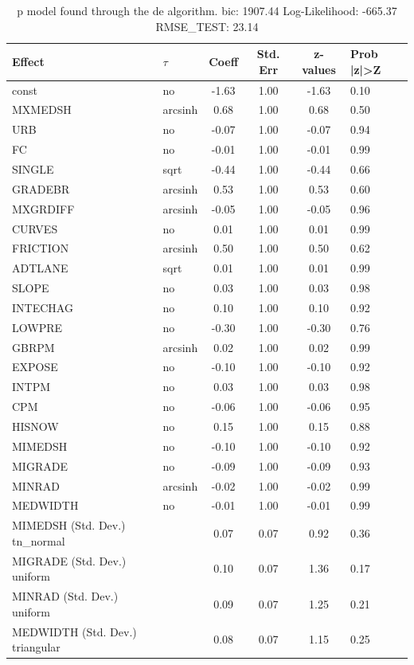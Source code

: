 \begin{table}
	\caption{p model found through the de algorithm. bic: 1907.44 Log-Likelihood: -665.37 RMSE_TEST: 23.14}
	\begin{center}
		\begin{tabular}{|l|l|c|c|c|l|}
			\hline
			Effect & $\tau$ & Coeff & Std. Err & z-values & Prob |z|>Z \\
			\hline
			const & no & -1.63 & 1.00 & -1.63 & 0.10 \\
			\hline
			MXMEDSH & arcsinh & 0.68 & 1.00 & 0.68 & 0.50 \\
			\hline
			URB & no & -0.07 & 1.00 & -0.07 & 0.94 \\
			\hline
			FC & no & -0.01 & 1.00 & -0.01 & 0.99 \\
			\hline
			SINGLE & sqrt & -0.44 & 1.00 & -0.44 & 0.66 \\
			\hline
			GRADEBR & arcsinh & 0.53 & 1.00 & 0.53 & 0.60 \\
			\hline
			MXGRDIFF & arcsinh & -0.05 & 1.00 & -0.05 & 0.96 \\
			\hline
			CURVES & no & 0.01 & 1.00 & 0.01 & 0.99 \\
			\hline
			FRICTION & arcsinh & 0.50 & 1.00 & 0.50 & 0.62 \\
			\hline
			ADTLANE & sqrt & 0.01 & 1.00 & 0.01 & 0.99 \\
			\hline
			SLOPE & no & 0.03 & 1.00 & 0.03 & 0.98 \\
			\hline
			INTECHAG & no & 0.10 & 1.00 & 0.10 & 0.92 \\
			\hline
			LOWPRE & no & -0.30 & 1.00 & -0.30 & 0.76 \\
			\hline
			GBRPM & arcsinh & 0.02 & 1.00 & 0.02 & 0.99 \\
			\hline
			EXPOSE & no & -0.10 & 1.00 & -0.10 & 0.92 \\
			\hline
			INTPM & no & 0.03 & 1.00 & 0.03 & 0.98 \\
			\hline
			CPM & no & -0.06 & 1.00 & -0.06 & 0.95 \\
			\hline
			HISNOW & no & 0.15 & 1.00 & 0.15 & 0.88 \\
			\hline
			MIMEDSH & no & -0.10 & 1.00 & -0.10 & 0.92 \\
			\hline
			MIGRADE & no & -0.09 & 1.00 & -0.09 & 0.93 \\
			\hline
			MINRAD & arcsinh & -0.02 & 1.00 & -0.02 & 0.99 \\
			\hline
			MEDWIDTH & no & -0.01 & 1.00 & -0.01 & 0.99 \\
			\hline
			MIMEDSH (Std. Dev.) tn_normal &  & 0.07 & 0.07 & 0.92 & 0.36 \\
			\hline
			MIGRADE (Std. Dev.) uniform &  & 0.10 & 0.07 & 1.36 & 0.17 \\
			\hline
			MINRAD (Std. Dev.) uniform &  & 0.09 & 0.07 & 1.25 & 0.21 \\
			\hline
			MEDWIDTH (Std. Dev.) triangular &  & 0.08 & 0.07 & 1.15 & 0.25 \\
			\hline
		\end{tabular}
	\end{center}
\end{table}